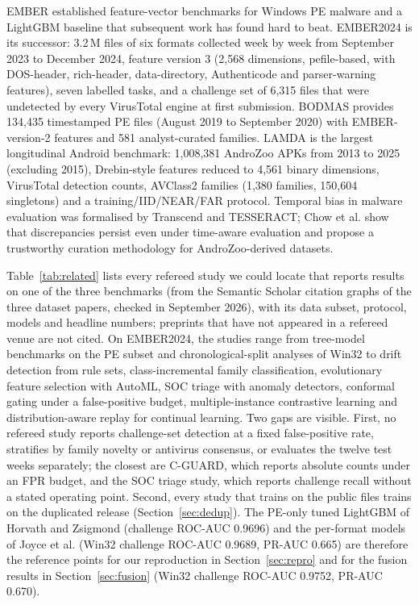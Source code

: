 \documentclass[fleqn,10pt]{wlscirep}
\newcommand{\lgbm}{LightGBM}
\begin{document}
EMBER\cite{anderson2018ember} established feature-vector benchmarks for Windows PE malware and a \lgbm{}\cite{ke2017lightgbm} baseline that subsequent work has found hard to beat. EMBER2024\cite{joyce2025ember2024} is its successor: 3.2\,M files of six formats collected week by week from September 2023 to December 2024, feature version 3 (2,568 dimensions, pefile-based, with DOS-header, rich-header, data-directory, Authenticode and parser-warning features), seven labelled tasks, and a challenge set of 6,315 files that were undetected by every VirusTotal engine at first submission. BODMAS\cite{yang2021bodmas} provides 134,435 timestamped PE files (August 2019 to September 2020) with EMBER-version-2 features and 581 analyst-curated families. LAMDA\cite{haque2026lamda} is the largest longitudinal Android benchmark: 1,008,381 AndroZoo APKs from 2013 to 2025 (excluding 2015), Drebin-style features reduced to 4,561 binary dimensions, VirusTotal detection counts, AVClass2 families (1,380 families, 150,604 singletons) and a training/IID/NEAR/FAR protocol. Temporal bias in malware evaluation was formalised by Transcend\cite{jordaney2017transcend} and TESSERACT\cite{pendlebury2019tesseract}; Chow et al.\cite{chow2026tesseract} show that discrepancies persist even under time-aware evaluation and propose a trustworthy curation methodology for AndroZoo-derived datasets.

Table~\ref{tab:related} lists every refereed study we could locate that reports results on one of the three benchmarks (from the Semantic Scholar citation graphs of the three dataset papers, checked in September 2026), with its data subset, protocol, models and headline numbers; preprints that have not appeared in a refereed venue are not cited. On EMBER2024, the studies range from tree-model benchmarks on the PE subset\cite{horvath2026benchmark} and chronological-split analyses of Win32\cite{mann2026temporal} to drift detection from rule sets\cite{kalny2026drift}, class-incremental family classification\cite{park2026tabcl}, evolutionary feature selection with AutoML\cite{raza2026automl}, SOC triage with anomaly detectors\cite{mossadaq2026triage}, conformal gating under a false-positive budget\cite{imran2026cguard}, multiple-instance contrastive learning\cite{nguyenkim2026pemilcon} and distribution-aware replay for continual learning\cite{rahman2025madar}. Two gaps are visible. First, no refereed study reports challenge-set detection at a fixed false-positive rate, stratifies by family novelty or antivirus consensus, or evaluates the twelve test weeks separately; the closest are C-GUARD, which reports absolute counts under an FPR budget, and the SOC triage study, which reports challenge recall without a stated operating point. Second, every study that trains on the public files trains on the duplicated release (Section~\ref{sec:dedup}). The PE-only tuned \lgbm{} of Horvath and Zsigmond\cite{horvath2026benchmark} (challenge ROC-AUC 0.9696) and the per-format models of Joyce et al.\cite{joyce2025ember2024} (Win32 challenge ROC-AUC 0.9689, PR-AUC 0.665) are therefore the reference points for our reproduction in Section~\ref{sec:repro} and for the fusion results in Section~\ref{sec:fusion} (Win32 challenge ROC-AUC 0.9752, PR-AUC 0.670).
\end{document}
